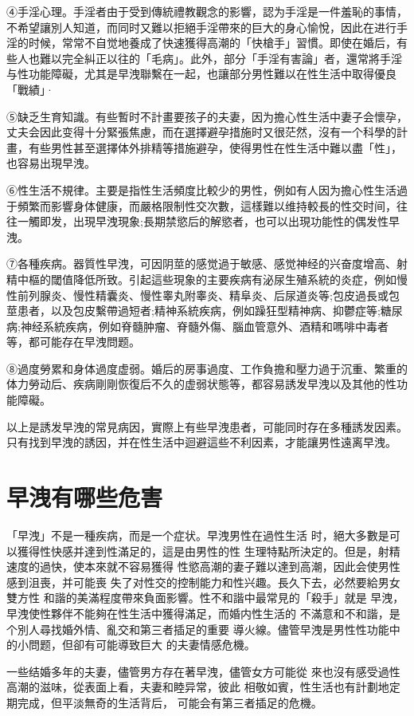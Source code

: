 \documentclass[12pt,UTF8]{ctexbook}
\begin{document}
④手淫心理。手淫者由于受到傳統禮教觀念的影響，認为手淫是一件羞恥的事情，不希望讓別人知道，而同时又難以拒絕手淫帶來的巨大的身心愉悅，因此在进行手淫的时候，常常不自觉地養成了快速獲得高潮的「快槍手」習慣。即使在婚后，有些人也難以完全糾正以往的「毛病」。此外，部分「手淫有害論」者，還常將手淫与性功能障礙，尤其是早洩聯繫在一起，也讓部分男性難以在性生活中取得優良「戰績」·

⑤缺乏生育知識。有些暫时不計畫要孩子的夫妻，因为擔心性生活中妻子会懷孕，丈夫会因此变得十分緊張焦慮，而在選擇避孕措施时又很茫然，沒有一个科學的計畫，有些男性甚至選擇体外排精等措施避孕，使得男性在性生活中難以盡「性」，也容易出現早洩。

⑥性生活不規律。主要是指性生活頻度比較少的男性，例如有人因为擔心性生活過于頻繁而影響身体健康，而嚴格限制性交次數，這樣難以维持較長的性交时间，往往一觸即发，出現早洩現象;長期禁慾后的解慾者，也可以出現功能性的偶发性早洩。

⑦各種疾病。器質性早洩，可因阴莖的感觉過于敏感、感觉神经的兴奋度增高、射精中樞的閾值降低所致。引起這些現象的主要疾病有泌尿生殖系統的炎症，例如慢性前列腺炎、慢性精囊炎、慢性睾丸附睾炎、精阜炎、后尿道炎等;包皮過長或包莖患者，以及包皮繫帶過短者;精神系統疾病，例如躁狂型精神病、抑鬱症等;糖尿病;神经系統疾病，例如脊髓肿瘤、脊髓外傷、腦血管意外、酒精和嗎啡中毒者等，都可能存在早洩問题。

⑧過度勞累和身体過度虚弱。婚后的房事過度、工作負擔和壓力過于沉重、繁重的体力勞动后、疾病剛剛恢復后不久的虚弱状態等，都容易誘发早洩以及其他的性功能障礙。

以上是誘发早洩的常見病因，實際上有些早洩患者，可能同时存在多種誘发因素。只有找到早洩的誘因，并在性生活中迴避這些不利因素，才能讓男性遠离早洩。

\section{早洩有哪些危害}

「早洩」不是一種疾病，而是一个症状。早洩男性在過性生活
时，絕大多數是可以獲得性快感并達到性滿足的，這是由男性的性
生理特點所決定的。但是，射精速度的過快，使本來就不容易獲得
性慾高潮的妻子難以達到高潮，因此会使男性感到沮喪，并可能喪
失了对性交的控制能力和性兴趣。長久下去，必然要給男女雙方性
和諧的美滿程度帶來負面影響。性不和諧中最常見的「殺手」就是
早洩，早洩使性夥伴不能夠在性生活中獲得滿足，而婚内性生活的
不滿意和不和諧，是个別人尋找婚外情、亂交和第三者插足的重要
導火線。儘管早洩是男性性功能中的小問题，但卻有可能導致巨大
的夫妻情感危機。

一些结婚多年的夫妻，儘管男方存在著早洩，儘管女方可能從
來也沒有感受過性高潮的滋味，從表面上看，夫妻和睦异常，彼此
相敬如賓，性生活也有計劃地定期完成，但平淡無奇的生活背后，
可能会有第三者插足的危機。
\end{document}
